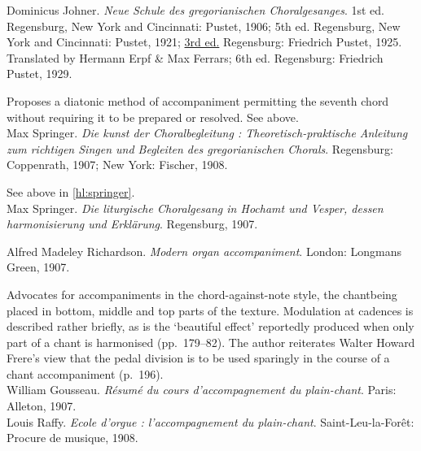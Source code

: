     \parindent=0pt
    \hangindent=0pt
  Dominicus Johner. \emph{Neue Schule des gregorianischen Choralgesanges}. 1st ed. Regensburg, New York and Cincinnati:  Pustet, 1906;  5th ed. Regensburg, New York and Cincinnati:  Pustet, 1921;  \underline{3rd ed.} Regensburg:  Friedrich Pustet, 1925. Translated by Hermann Erpf \& Max Ferrars;  6th ed. Regensburg:  Friedrich Pustet, 1929.

     \parindent=20pt
     \hangindent=20pt
     Proposes a diatonic method of accompaniment permitting the seventh chord without requiring it to be prepared or resolved. See  above.\\

    \parindent=0pt
    \hangindent=0pt
  Max Springer. \emph{Die kunst der Choralbegleitung : Theoretisch-praktische Anleitung zum richtigen Singen und Begleiten des gregorianischen Chorals}. Regensburg:  Coppenrath, 1907;  New York:  Fischer, 1908.

     \parindent=20pt
     \hangindent=20pt
     See above in \cref{hl:springer}.\\

    \parindent=0pt
    \hangindent=0pt
  \covid{}Max Springer. \emph{Die liturgische Choralgesang in Hochamt und Vesper, dessen harmonisierung und Erklärung}. Regensburg, 1907. \\\pagebreak{}

    \parindent=0pt
    \hangindent=0pt
  Alfred Madeley Richardson. \emph{Modern organ accompaniment}. London:  Longmans Green, 1907.

     \parindent=20pt
     \hangindent=20pt
     Advocates for accompaniments in the chord-against-note style, the chantbeing placed in bottom, middle and top parts of the texture. Modulation at cadences is described rather briefly, as is the `beautiful effect' reportedly produced when only part of a chant is harmonised (pp.~179--82). The author reiterates Walter Howard Frere's view that the pedal division is to be used sparingly in the course of a chant accompaniment (p.~196).\\

    \parindent=0pt
    \hangindent=0pt
  \covid{}William Gousseau. \emph{Résumé du cours d'accompagnement du plain-chant}. Paris:  Alleton, 1907. \\

    \parindent=0pt
    \hangindent=0pt
  \covid{}Louis Raffy. \emph{Ecole d'orgue : l'accompagnement du plain-chant}. Saint-Leu-la-Forêt:  Procure de musique, 1908. \\

